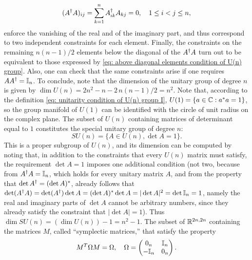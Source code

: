     \begin{equation}
    \label{eq: above diagonal elements condition of U(n) group}
        (A^\dagger A)_{ij} = \sum_{k=1}^{n} A_{ik}^\dagger A_{kj} = 0, \quad 1 \le i < j \le n,
    \end{equation}
    enforce the vanishing of the real and of the imaginary part, and thus correspond to two independent constraints for each element. Finally, the constraints on the remaining $n(n-1)/2$ elements below the diagonal of the $A^\dagger A$ turn out to be equivalent to those expressed by \eqref{eq: above diagonal elements condition of U(n) group}. Also, one can check that the same constraints arise if one requires $A A^\dagger = \mathbb{I}_n$. To conclude, note that the dimension of the unitary group of degree $n$ is given by $\dim U(n) = 2n^2 - n - 2\, n(n-1)/2 = n^2$. Note that, according to the definition \eqref{eq: unitarity condition of U(n) group I}, $U(1) = \{ a \in \mathbb{C} : a^* a = 1 \}$, so the group manifold of $U(1)$ can be identified with the circle of unit radius on the complex plane. The subset of $U(n)$ containing matrices of determinant equal to $1$ constitutes the special unitary group of degree $n$:
    \begin{equation}
        SU(n) = \{ A \in U(n), \det A = 1 \}.
    \end{equation}
    This is a proper subgroup of $U(n)$, and its dimension can be computed by noting that, in addition to the constraints that every $U(n)$ matrix must satisfy, the requirement $\det A = 1$ imposes one additional condition (not two, because from $A^\dagger A = \mathbb{I}_n$, which holds for every unitary matrix $A$, and from the property that $\det A^\dagger = (\det A)^*$, already follows that $\det(A^\dagger A) = \det(A^\dagger)\det A = (\det A)^* \det A = |\det A|^2 = \det \mathbb{I}_n = 1$, namely the real and imaginary parts of $\det A$ cannot be arbitrary numbers, since they already satisfy the constraint that $|\det A| = 1$). Thus $\dim SU(n) = (\dim U(n)) - 1 = n^2 - 1$. The subset of $\mathbb{R}^{2n,2n}$ containing the matrices $M$, called ``symplectic matrices,'' that satisfy the property
    \begin{equation}
        M^T \Omega M = \Omega, \quad \Omega =
        \begin{pmatrix}
        0_n & \mathbb{I}_n \\
        -\mathbb{I}_n & 0_n
        \end{pmatrix}.
    \end{equation}

